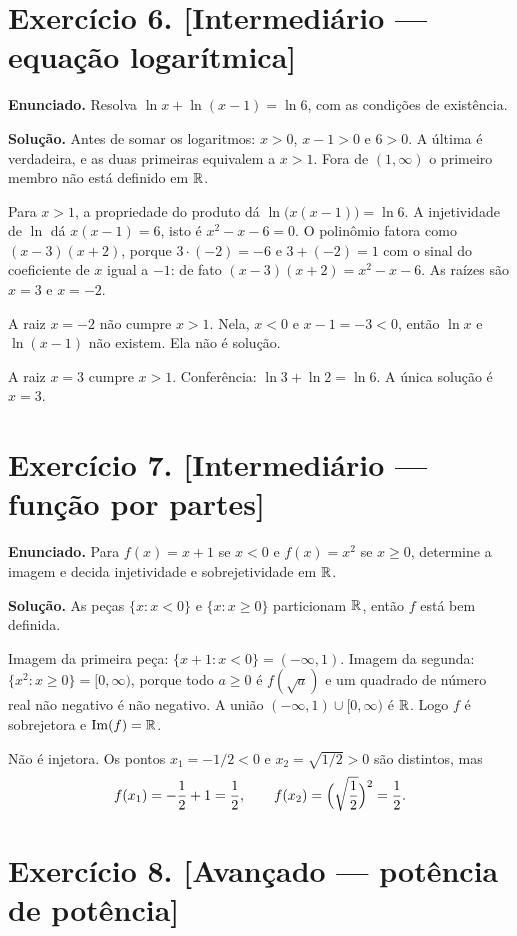 \documentclass[11pt,a4paper]{article}
\begin{document}
\section*{Exercício 6. [Intermediário --- equação logarítmica]}

\textbf{Enunciado.} Resolva $\ln x+\ln(x-1)=\ln 6$, com as condições de existência.

\textbf{Solução.}
Antes de somar os logaritmos: $x>0$, $x-1>0$ e $6>0$. A última é verdadeira, e as duas primeiras equivalem a $x>1$. Fora de $(1,\infty)$ o primeiro membro não está definido em $\mathbb{R}$.

Para $x>1$, a propriedade do produto dá $\ln\bigl(x(x-1)\bigr)=\ln 6$. A injetividade de $\ln$ dá $x(x-1)=6$, isto é $x^2-x-6=0$. O polinômio fatora como $(x-3)(x+2)$, porque $3\cdot(-2)=-6$ e $3+(-2)=1$ com o sinal do coeficiente de $x$ igual a $-1$: de fato $(x-3)(x+2)=x^2-x-6$. As raízes são $x=3$ e $x=-2$.

A raiz $x=-2$ não cumpre $x>1$. Nela, $x<0$ e $x-1=-3<0$, então $\ln x$ e $\ln(x-1)$ não existem. Ela não é solução.

A raiz $x=3$ cumpre $x>1$. Conferência: $\ln 3+\ln 2=\ln 6$. A única solução é $x=3$.

\section*{Exercício 7. [Intermediário --- função por partes]}

\textbf{Enunciado.} Para $f(x)=x+1$ se $x<0$ e $f(x)=x^2$ se $x\ge 0$, determine a imagem e decida injetividade e sobrejetividade em $\mathbb{R}$.

\textbf{Solução.}
As peças $\{x:x<0\}$ e $\{x:x\ge 0\}$ particionam $\mathbb{R}$, então $f$ está bem definida.

Imagem da primeira peça: $\{x+1:x<0\}=(-\infty,1)$. Imagem da segunda: $\{x^2:x\ge 0\}=[0,\infty)$, porque todo $a\ge 0$ é $f(\sqrt{a})$ e um quadrado de número real não negativo é não negativo. A união $(-\infty,1)\cup[0,\infty)$ é $\mathbb{R}$. Logo $f$ é sobrejetora e $\operatorname{Im}(f)=\mathbb{R}$.

Não é injetora. Os pontos $x_1=-1/2<0$ e $x_2=\sqrt{1/2}>0$ são distintos, mas
\[
f(x_1)=-\frac12+1=\frac12,\qquad f(x_2)=\Bigl(\sqrt{\frac12}\Bigr)^2=\frac12.
\]

\section*{Exercício 8. [Avançado --- potência de potência]}
\end{document}
